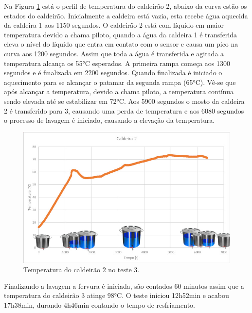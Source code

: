 Na Figura \ref{teste03c2} está o perfil de temperatura do caldeirão 2, abaixo da curva estão os estados do caldeirão. Inicialmente a caldeira está vazia, esta recebe água aquecida da caldeira 1 aos 1150 segundos. O caldeirão 2 está com líquido em maior temperatura devido a chama piloto, quando a água da caldeira 1 é transferida eleva o nível do líquido que entra em contato com o sensor e causa um pico na curva aos 1200 segundos. Assim que toda a água é transferida e agitada a temperatura alcança os 55°C esperados. A primeira rampa começa aos 1300 segundos e é finalizada em 2200 segundos. Quando finalizada é iniciado o aquecimento para se alcançar o patamar da segunda rampa (65°C). Vê-se que após alcançar a temperatura, devido a chama piloto, a temperatura contínua sendo elevada até se estabilizar em 72°C. Aos 5900 segundos o mosto da caldeira 2 é transferido para 3, causando uma perda de temperatura e aos 6080 segundos o processo de lavagem é iniciado, causando a elevação da temperatura.

  \begin{figure}[htb]
	\caption{\label{teste03c2}Temperatura do caldeirão 2 no teste 3.}
	\begin{center}
	    \includegraphics[width=0.95\linewidth]{./img/teste03_cald2.jpg}
	\end{center}
\end{figure}

Finalizando a lavagem a fervura é iniciada, são contados 60 minutos assim que a temperatura do caldeirão 3 atinge 98°C. O teste iniciou 12h52min e acabou 17h38min, durando 4h46min contando o tempo de resfriamento. 


